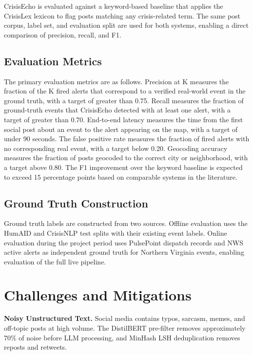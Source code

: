 \documentclass[conference]{IEEEtran}
\begin{document}
CrisisEcho is evaluated against a keyword-based baseline that applies the
CrisisLex lexicon to flag posts matching any crisis-related term. The same
post corpus, label set, and evaluation split are used for both systems,
enabling a direct comparison of precision, recall, and F1.

\subsection{Evaluation Metrics}

The primary evaluation metrics are as follows. Precision at K measures the
fraction of the K fired alerts that correspond to a verified real-world event
in the ground truth, with a target of greater than 0.75. Recall measures the
fraction of ground-truth events that CrisisEcho detected with at least one
alert, with a target of greater than 0.70. End-to-end latency measures the
time from the first social post about an event to the alert appearing on the
map, with a target of under 90 seconds. The false positive rate measures the
fraction of fired alerts with no corresponding real event, with a target below
0.20. Geocoding accuracy measures the fraction of posts geocoded to the correct
city or neighborhood, with a target above 0.80. The F1 improvement over the
keyword baseline is expected to exceed 15 percentage points based on comparable
systems in the literature.

\subsection{Ground Truth Construction}

Ground truth labels are constructed from two sources. Offline evaluation uses
the HumAID and CrisisNLP test splits with their existing event labels.
Online evaluation during the project period uses PulsePoint dispatch records
and NWS active alerts as independent ground truth for Northern Virginia events,
enabling evaluation of the full live pipeline.

\section{Challenges and Mitigations}

\textbf{Noisy Unstructured Text.} Social media contains typos, sarcasm, memes,
and off-topic posts at high volume. The DistilBERT pre-filter removes approximately
70\% of noise before LLM processing, and MinHash LSH deduplication removes
reposts and retweets.
\end{document}
